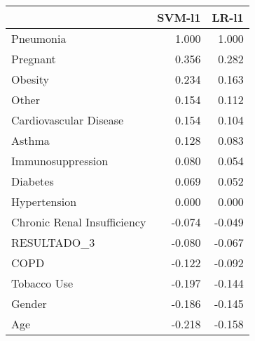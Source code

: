 \begin{tabular}{lrr}
\toprule
{} &  SVM-l1 &  LR-l1 \\
\midrule
Pneumonia                   &   1.000 &  1.000 \\
Pregnant                    &   0.356 &  0.282 \\
Obesity                     &   0.234 &  0.163 \\
Other                       &   0.154 &  0.112 \\
Cardiovascular Disease      &   0.154 &  0.104 \\
Asthma                      &   0.128 &  0.083 \\
Immunosuppression           &   0.080 &  0.054 \\
Diabetes                    &   0.069 &  0.052 \\
Hypertension                &   0.000 &  0.000 \\
Chronic Renal Insufficiency &  -0.074 & -0.049 \\
RESULTADO\_3                 &  -0.080 & -0.067 \\
COPD                        &  -0.122 & -0.092 \\
Tobacco Use                 &  -0.197 & -0.144 \\
Gender                      &  -0.186 & -0.145 \\
Age                         &  -0.218 & -0.158 \\
\bottomrule
\end{tabular}

